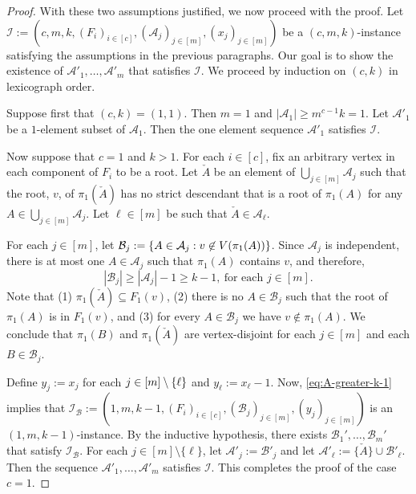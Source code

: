 \documentclass{patmorin}
\DeclarePairedDelimiter\set{\{}{\}}
\renewcommand{\mid}{:}  %
\begin{document}
\begin{proof}
With these two assumptions justified, we now proceed with the proof.  Let $\mathcal{I}:=(c,m,k,(F_i)_{i\in[c]},(\mathcal{A}_j)_{j\in[m]},(x_j)_{j\in[m]})$ be a $(c,m,k)$-instance satisfying the assumptions in the previous paragraphs.  Our goal is to show the existence of $\mathcal{A}'_1,\ldots,\mathcal{A}'_m$ that satisfies $\mathcal{I}$.  We proceed by induction on $(c,k)$ in lexicograph order.  

Suppose first that $(c,k)=(1,1)$. Then $m=1$ and $|\mathcal{A}_1|\ge m^{c-1} k=1$.  Let $\mathcal{A}'_1$ be a $1$-element subset of $\mathcal{A}_1$.  Then the one element sequence $\mathcal{A}'_1$ satisfies $\mathcal{I}$.


Now suppose that $c=1$ and $k>1$.
For each $i\in[c]$, fix an arbitrary vertex in each component of $F_i$ to be a root.
Let $\check{A}$ be an element of $\bigcup_{j\in[m]}\mathcal{A}_j$ such that the root, $v$, of $\pi_1(\check{A})$ has no strict descendant that is a root of $\pi_1(A)$ for any $A\in\bigcup_{j\in[m]}\mathcal{A}_j$.
Let $\ell\in[m]$ be such that $\check{A}\in\mathcal{A}_{\ell}$.

For each $j\in[m]$,
let $\mathcal{B}_j:=\set{A\in\mathcal{A}_j\mid v\not\in V(\pi_1(A))}$.
Since $\mathcal{A}_j$ is independent, there is at most one $A\in\mathcal{A}_j$ such that $\pi_1(A)$ contains $v$,
and therefore, 
\begin{equation}
|\mathcal{B}_j|\geq |\mathcal{A}_j|-1\geq k-1,\ \textrm{for each $j\in[m]$}.
\label{eq:A-greater-k-1}
\end{equation}
Note that
(1) $\pi_1(\check{A})\subseteq F_1(v)$,
(2) there is no $A\in\mathcal{B}_j$ such that the root of $\pi_1(A)$ is in $F_1(v)$, and
(3) for every $A\in\mathcal{B}_j$ we have $v\notin\pi_1(A)$.
We conclude that $\pi_1(B)$ and $\pi_1(\check{A})$ are vertex-disjoint for each $j\in[m]$ and each $B\in\mathcal{B}_j$.

Define
$y_j:=x_j$ for each $j\in[m]\setminus\set{\ell}$ and $y_\ell:=x_{\ell}-1$.  
Now, \eqref{eq:A-greater-k-1} implies that
$\mathcal{I}_\mathcal{B}:=(1,m,k-1,(F_i)_{i\in[c]},(\mathcal{B}_j)_{j\in[m]},(y_j)_{j\in[m]})$ is an $(1,m,k-1)$-instance.  By the inductive hypothesis, there exists $\mathcal{B}_1',\ldots,\mathcal{B}_m'$ that satisfy $\mathcal{I}_\mathcal{B}$.
For each $j\in[m]\setminus\{\ell\}$, let $\mathcal{A}'_j:=\mathcal{B}'_j$ and let $\mathcal{A}'_\ell:= \{\check{A}\} \cup \mathcal{B}'_\ell$.
Then the sequence $\mathcal{A}'_1,\ldots,\mathcal{A}'_m$ satisfies $\mathcal{I}$.
This completes the proof of the case $c=1$.


\end{proof}
\end{document}
